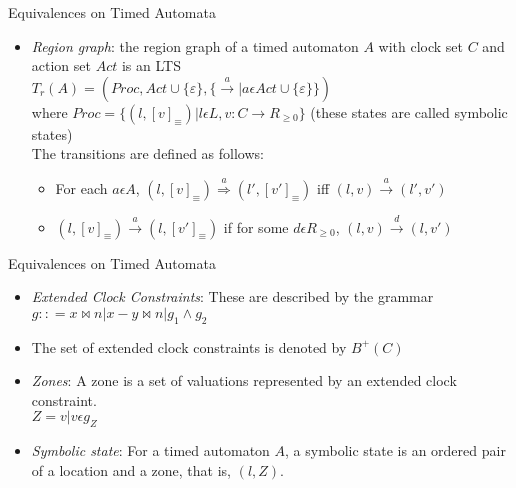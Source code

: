 \documentclass{beamer}
\begin{document}
\begin{frame}{Equivalences on Timed Automata}

  \begin{itemize}

  \item \emph{Region graph}: the region graph of a timed automaton $A$ with clock set $C$
    and action set $Act$ is an LTS\\
    $T_r(A) = (Proc,Act \cup \{\varepsilon\}, \{\xrightarrow{a}|a \epsilon
    Act \cup \{\varepsilon\}\})$\\
    where $Proc = \{(l, [v]_{\equiv}) | l \epsilon L, v: C \rightarrow
    R_{\ge 0}\}$ (these states are called symbolic states)\\
    The transitions are defined as follows:
    \begin{itemize}
    \item For each $a \epsilon A$, $(l, [v]_{\equiv})
      \overset{a}{\Rightarrow} (l', [v']_{\equiv})$ iff $(l,v)
      \overset{a}{\rightarrow} (l', v')$
    \item $(l, [v]_{\equiv}) \xrightarrow{a} (l, [v']_{\equiv})$ if
      for some $d \epsilon R_{\ge 0}$, $(l, v) \xrightarrow{d} (l,
      v')$
    \end{itemize}

  \end{itemize}

\end{frame}

\begin{frame}{Equivalences on Timed Automata}

  \begin{itemize}

    \item \emph{Extended Clock Constraints}: These are described by the  grammar\\
    $g :: = x \bowtie n | x - y \bowtie n | g_1 \wedge g_2$\\

    \item The set of extended clock constraints is denoted by $B^+(C)$

    \item \emph{Zones}: A zone is a set of valuations represented by an
      extended clock constraint.\\
      $Z = {v|v \epsilon g_Z}$

    \item \emph{Symbolic state}: For a timed automaton $A$, a symbolic
      state is an ordered pair of a location and a zone, that is, $(l,
      Z)$.

  \end{itemize}

\end{frame}
\end{document}
